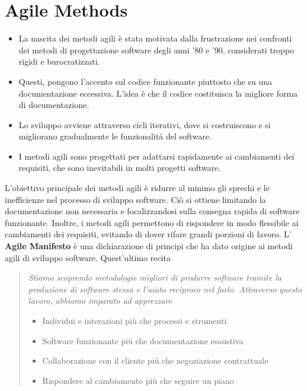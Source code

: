 \documentclass[10pt, letterpaper]{report}
\begin{document}
\section{Agile Methods}\begin{itemize}
    \item
La nascita dei metodi agili è stata motivata dalla frustrazione nei confronti dei metodi di progettazione software degli anni '80 e '90, considerati troppo rigidi e burocratizzati.   \item  Questi, pongono l'accento sul codice funzionante piuttosto che su una documentazione eccessiva. L'idea è che il codice costituisca la migliore forma di documentazione.  \item  Lo sviluppo avviene attraverso cicli iterativi, dove si costruiscono e si migliorano gradualmente le funzionalità del software.   \item  I metodi agili sono progettati per adattarsi rapidamente ai cambiamenti dei requisiti, che sono inevitabili in molti progetti software.\end{itemize}
L'obiettivo principale dei metodi agili è ridurre al minimo gli sprechi e le inefficienze nel processo di sviluppo software. Ciò si ottiene limitando la documentazione non necessaria e focalizzandosi sulla consegna rapida di software funzionante. Inoltre, i metodi agili permettono di rispondere in modo flessibile ai cambiamenti dei requisiti, evitando di dover rifare grandi porzioni di lavoro.\acc 
L' \textbf{Agile Manifesto} è una dichiarazione di principi che ha dato origine ai metodi agili di sviluppo software. Quest'ultimo recita\begin{quote}
    \textit{Stiamo scoprendo metodologie migliori di produrre software tramite la produzione di software stessa e l'aiuto reciproco nel farlo. Attraverso questo lavoro, abbiamo imparato ad apprezzare}\begin{itemize}
        \item Individui e interazioni più che processi e strumenti
        \item Software funzionante più che documentazione esaustiva
        \item Collaborazione con il cliente più che negoziazione contrattuale
        \item Rispondere al cambiamento più che seguire un piano
    \end{itemize}
\end{quote}
\end{document}
